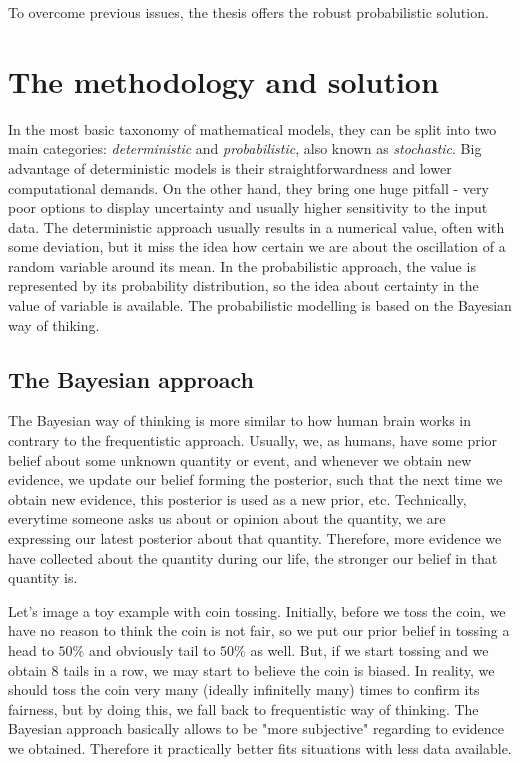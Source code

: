 \documentclass[
  digital, %
  table,   %
  twoside, %
  12pt,
  lof,     %
  lot,     %
]{fithesis3}
\begin{document}
To overcome previous issues, the thesis offers the robust 
probabilistic solution.


\chapter{The methodology and solution}

In the most basic taxonomy of mathematical models, they can be 
split into two main categories: \textit{deterministic} and 
\textit{probabilistic}, also known as \textit{stochastic}. 
Big advantage of deterministic models is their 
straightforwardness and lower computational demands. 
On the other hand, they bring one huge pitfall - very 
poor options to display uncertainty and usually higher 
sensitivity to the input data. 
The deterministic approach usually results in a numerical 
value, often with some deviation, but it miss the idea 
how certain we are about the oscillation of a random 
variable around its mean. 
In the probabilistic approach, the value is represented 
by its probability distribution, so the idea about 
certainty in the value of variable is available. 
The probabilistic modelling is based on the Bayesian 
way of thiking.

\section{The Bayesian approach}

The Bayesian way of thinking is more similar to how human 
brain works in contrary to the frequentistic approach. 
Usually, we, as humans, have some prior belief about some 
unknown quantity or event, and whenever we obtain new 
evidence, we update our belief forming the posterior, such 
that the next time we obtain new evidence, this posterior 
is used as a new prior, etc. 
Technically, everytime someone asks us about or opinion 
about the quantity, we are expressing our latest posterior 
about that quantity. 
Therefore, more evidence we have collected about the 
quantity during our life, the stronger our belief in 
that quantity is.

Let's image a toy example with coin tossing. 
Initially, before we toss the coin, we have no reason 
to think the coin is not fair, so we put our prior belief 
in tossing a head to $50\%$ and obviously tail to 
$50\%$ as well. 
But, if we start tossing and we obtain 8 tails in a row, 
we may start to believe the coin is biased. 
In reality, we should toss the coin very many (ideally 
infinitelly many) times to confirm its fairness, but 
by doing this, we fall back to frequentistic way of 
thinking. 
The Bayesian approach basically allows to be 
"more subjective" regarding to evidence we obtained. 
Therefore it practically better fits situations with 
less data available.
\end{document}
